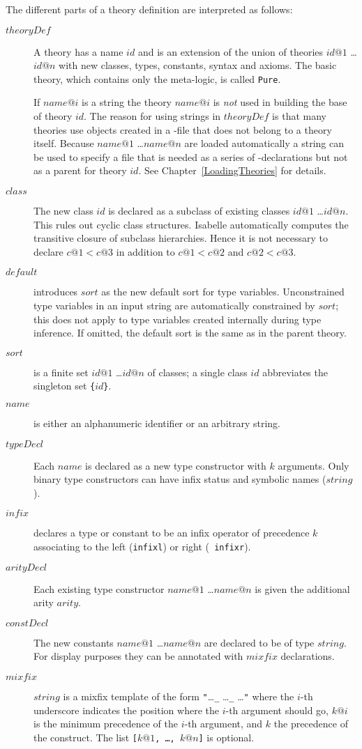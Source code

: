 The different parts of a theory definition are interpreted as follows:
\begin{description} 
\item[$theoryDef$] A theory has a name $id$ and is an
  extension of the union of theories $id@1$ \dots $id@n$ with new
  classes, types, constants, syntax and axioms. The basic theory, which 
  contains only the meta-logic, is called {\tt Pure}.

  If $name@i$ is a string the theory $name@i$ is {\em not} used in building
  the base of theory $id$.  The reason for using strings in $theoryDef$ is that
  many theories use objects created in a \ML-file that does not belong to a
  theory itself.  Because $name@1$ \dots $name@n$ are loaded automatically a
  string can be used to specify a file that is needed as a series of 
  \ML{}-declarations but not as a parent for theory $id$.  See
  Chapter~\ref{LoadingTheories} for details.
\item[$class$] The new class $id$ is declared as a subclass of existing
  classes $id@1$ \dots $id@n$.  This rules out cyclic class structures.
  Isabelle automatically computes the transitive closure of subclass
  hierarchies.  Hence it is not necessary to declare $c@1 < c@3$ in addition
  to $c@1 < c@2$ and $c@2 < c@3$.
\item[$default$] introduces $sort$ as the new default sort for type
  variables.  Unconstrained type variables in an input string are
  automatically constrained by $sort$; this does not apply to type variables
  created internally during type inference.  If omitted,
  the default sort is the same as in the parent theory.
\item[$sort$] is a finite set $id@1$ \dots $id@n$ of classes; a single class
  $id$ abbreviates the singleton set {\tt\{}$id${\tt\}}.
\item[$name$] is either an alphanumeric identifier or an arbitrary string.
\item[$typeDecl$] Each $name$ is declared as a new type constructor with
  $k$ arguments.  Only binary type constructors can have infix status and
  symbolic names ($string$).
\item[$infix$] declares a type or constant to be an infix operator of
  precedence $k$ associating to the left ({\tt infixl}) or right ({\tt
    infixr}).
\item[$arityDecl$] Each existing type constructor $name@1$ \dots $name@n$
  is given the additional arity $arity$.
\item[$constDecl$] The new constants $name@1$ \dots $name@n$ are declared to
  be of type $string$.  For display purposes they can be annotated with
  $mixfix$ declarations.
\item[$mixfix$] $string$ is a mixfix template of the form {\tt"}\dots{\tt\_}
  \dots{\tt\_} \dots{\tt"} where the $i$-th underscore indicates the position
  where the $i$-th argument should go, $k@i$ is the minimum precedence of
  the $i$-th argument, and $k$ the precedence of the construct.  The list
  \hbox{\tt[$k@1$, \dots, $k@n$]} is optional.


\end{description}
